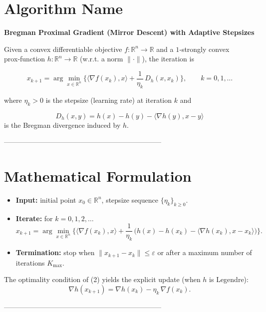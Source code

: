 \documentclass{article}
\newcommand{\R}{\mathbb{R}}
\newcommand{\inner}[2]{\langle #1,#2\rangle}
\newcommand{\Breg}[2]{D_{h}(#1,#2)}
\newcommand{\grad}{\nabla}
\begin{document}
\section*{Algorithm Name}
\textbf{Bregman Proximal Gradient (Mirror Descent) with Adaptive Stepsizes}  

Given a convex differentiable objective $f:\R^{n}\rightarrow\R$ and a $1$‑strongly convex prox‑function $h:\R^{n}\rightarrow\R$ (w.r.t. a norm $\|\cdot\|$), the iteration is  

\[
x_{k+1}= \arg\min_{x\in\R^{n}}
\Big\{ \inner{\grad f(x_{k})}{x}+ \frac{1}{\eta_{k}}\,\Breg{x}{x_{k}}\Big\},
\qquad k=0,1,\dots
\tag{1}
\]

where $\eta_{k}>0$ is the stepsize (learning rate) at iteration $k$ and  

\[
\Breg{x}{y}=h(x)-h(y)-\inner{\grad h(y)}{x-y}
\]
is the Bregman divergence induced by $h$.

--------------------------------------------------------------------

\section*{Mathematical Formulation}
\begin{itemize}
    \item \textbf{Input:} initial point $x_{0}\in\R^{n}$, stepsize sequence $\{\eta_{k}\}_{k\ge 0}$.
    \item \textbf{Iterate:} for $k=0,1,2,\dots$
    \[
    \boxed{
    x_{k+1}= \arg\min_{x\in\R^{n}}
    \Big\{ \inner{\grad f(x_{k})}{x}+ \frac{1}{\eta_{k}}\,
    \big( h(x)-h(x_{k})-\inner{\grad h(x_{k})}{x-x_{k}}\big) \Big\}
    }.
    \tag{2}
    \]
    \item \textbf{Termination:} stop when $\|x_{k+1}-x_{k}\|\le \varepsilon$ or after a maximum number of iterations $K_{\max }$.
\end{itemize}

The optimality condition of (2) yields the explicit update (when $h$ is Legendre):
\[
\grad h(x_{k+1}) = \grad h(x_{k}) - \eta_{k}\,\grad f(x_{k}). \tag{3}
\]

--------------------------------------------------------------------
\end{document}
